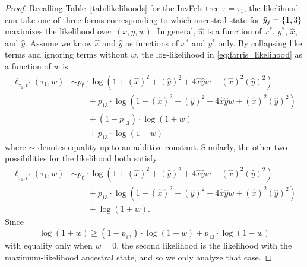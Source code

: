 \begin{proof}
Recalling Table~\ref{tab:likelihoods} for the InvFels tree $\tau = \tau_1$, the likelihood can take one of three forms corresponding to which ancestral state for $\tilde{y}_j=\{1,3\}$ maximizes the likelihood over $(x,y,w)$.
In general, $\hat{w}$ is a function of $x^*$, $y^*$, $\hat{x}$, and $\hat{y}$.
Assume we know $\hat{x}$ and $\hat{y}$ as functions of $x^*$ and $y^*$ only.
By collapsing like terms and ignoring terms without $w$, the log-likelihood in \eqref{eq:farris_likelihood} as a function of $w$ is
\begin{align*}
    \ell_{\tau_1,t^*}(\tau_1, w)
    &\sim     p_{\emptyset}  \cdot\log(1+(\hat{x})^2+(\hat{y})^2+4\hat{x}\hat{y}w+(\hat{x})^2(\hat{y})^2) \\
    &\qquad + p_{13}         \cdot\log(1+(\hat{x})^2+(\hat{y})^2-4\hat{x}\hat{y}w+(\hat{x})^2(\hat{y})^2) \\
    &\qquad + (1 - p_{13})\cdot\log(1+w) \\
    &\qquad + p_{13}\cdot\log(1-w)
\end{align*}
where $\sim$ denotes equality up to an additive constant.
Similarly, the other two possibilities for the likelihood both satisfy
\begin{align*}
    \ell_{\tau_1,t^*}(\tau_1, w)
    &\sim     p_{\emptyset}  \cdot\log(1+(\hat{x})^2+(\hat{y})^2+4\hat{x}\hat{y}w+(\hat{x})^2(\hat{y})^2) \\
    &\qquad + p_{13}         \cdot\log(1+(\hat{x})^2+(\hat{y})^2-4\hat{x}\hat{y}w+(\hat{x})^2(\hat{y})^2) \\
    &\qquad + \log(1+w).
\end{align*}
Since
\[
\log(1+w) \geq (1 - p_{13})\cdot\log(1+w) + p_{13}\cdot\log(1-w)
\]
with equality only when $w=0$, the second likelihood is the likelihood with the maximum-likelihood ancestral state, and so we only analyze that case.


\end{proof}
